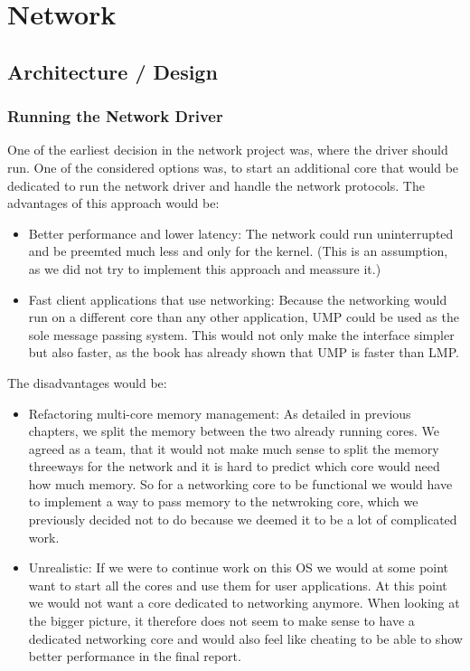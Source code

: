 \chapter{Network}

\section{Architecture / Design}

\subsection{Running the Network Driver}

One of the earliest decision in the network project was, where the driver should run. One of the considered options was, to start an additional core that would be dedicated to run the network driver and handle the network protocols. The advantages of this approach would be:
\begin{itemize}
    \item Better performance and lower latency: The network could run uninterrupted and be preemted much less and only for the kernel. (This is an assumption, as we did not try to implement this approach and meassure it.)
    \item Fast client applications that use networking: Because the networking would run on a different core than any other application, UMP could be used as the sole message passing system. This would not only make the interface simpler but also faster, as the book has already shown that UMP is faster than LMP.
\end{itemize}
The disadvantages would be:
\begin{itemize}
    \item Refactoring multi-core memory management: As detailed in previous chapters, we split the memory between the two already running cores. We agreed as a team, that it would not make much sense to split the memory threeways for the network and it is hard to predict which core would need how much memory. So for a networking core to be functional we would have to implement a way to pass memory to the netwroking core, which we previously decided not to do because we deemed it to be a lot of complicated work.
    \item Unrealistic: If we were to continue work on this OS we would at some point want to start all the cores and use them for user applications. At this point we would not want a core dedicated to networking anymore. When looking at the bigger picture, it therefore does not seem to make sense to have a dedicated networking core and would also feel like cheating to be able to show better performance in the final report.
\end{itemize}

